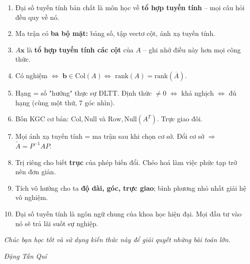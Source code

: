 \documentclass[12pt,a4paper]{article}
\begin{document}
\begin{enumerate}
  \item Đại số tuyến tính bản chất là môn học về \textbf{tổ hợp tuyến tính} -- mọi câu hỏi đều quy về nó.
  \item Ma trận có \textbf{ba bộ mặt:} bảng số, tập vectơ cột, ánh xạ tuyến tính.
  \item $A\mathbf{x}$ là \textbf{tổ hợp tuyến tính các cột} của $A$ -- ghi nhớ điều này hơn mọi công thức.
  \item Có nghiệm $\Leftrightarrow$ $\mathbf{b} \in \mathrm{Col}(A) \Leftrightarrow$ $\mathrm{rank}(A) = \mathrm{rank}(\overline{A})$.
  \item Hạng = số "hướng" thực sự ĐLTT. Định thức $\ne 0$ $\Leftrightarrow$ khả nghịch $\Leftrightarrow$ đủ hạng (cùng một thứ, 7 góc nhìn).
  \item Bốn KGC cơ bản: $\mathrm{Col}, \mathrm{Null}$ và $\mathrm{Row}, \mathrm{Null}(A^T)$. Trực giao đôi.
  \item Mọi ánh xạ tuyến tính = ma trận sau khi chọn cơ sở. Đổi cơ sở $\Rightarrow$ $\widetilde{A} = P^{-1} A P$.
  \item Trị riêng cho biết \textbf{trục} của phép biến đổi. Chéo hoá làm việc phức tạp trở nên đơn giản.
  \item Tích vô hướng cho ta \textbf{độ dài, góc, trực giao}; bình phương nhỏ nhất giải hệ vô nghiệm.
  \item Đại số tuyến tính là ngôn ngữ chung của khoa học hiện đại. Mọi đầu tư vào nó sẽ trả lãi suốt sự nghiệp.
\end{enumerate}

\bigskip

\noindent \textit{Chúc bạn học tốt và sử dụng kiến thức này để giải quyết những bài toán lớn.}

\hfill \textit{Đặng Tấn Quí}
\end{document}

